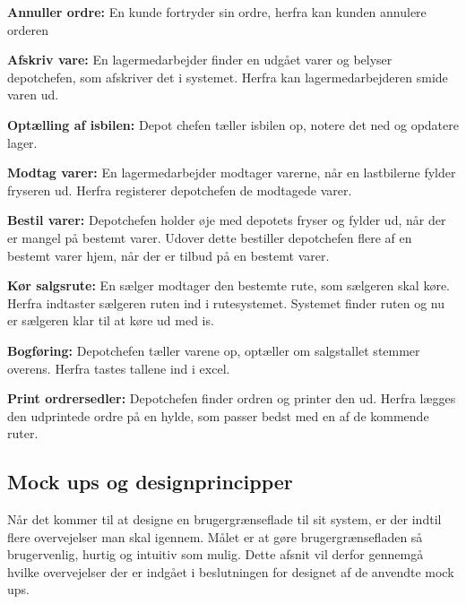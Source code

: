 \textbf{Annuller ordre:}
En kunde fortryder sin ordre, herfra kan kunden annulere orderen

\textbf{Afskriv vare:} 
En lagermedarbejder finder en udgået varer og belyser depotchefen, som afskriver det i systemet. Herfra kan lagermedarbejderen smide varen ud. 

\textbf{Optælling af isbilen:} 
Depot chefen tæller isbilen op, notere det ned og opdatere lager. 

\textbf{Modtag varer:} 
En lagermedarbejder modtager varerne, når en lastbilerne fylder fryseren ud. Herfra registerer depotchefen de modtagede varer. 

\textbf{Bestil varer:} 
Depotchefen holder øje med depotets fryser og fylder ud, når der er mangel på bestemt varer. Udover dette bestiller depotchefen flere af en bestemt varer hjem, når der er tilbud på en bestemt varer. 

\textbf{Kør salgsrute:} 
En sælger modtager den bestemte rute, som sælgeren skal køre. Herfra indtaster sælgeren ruten ind i rutesystemet. Systemet finder ruten og nu er sælgeren klar til at køre ud med is. 

\textbf{Bogføring:}
Depotchefen tæller varene op, optæller om salgstallet stemmer overens. Herfra tastes tallene ind i excel. 

\textbf{Print ordrersedler:}
Depotchefen finder ordren og printer den ud. Herfra lægges den udprintede ordre på en hylde, som passer bedst med en af de kommende ruter.

\subsection{Mock ups og designprincipper}
Når det kommer til at designe en brugergrænseflade til sit system, er der indtil flere overvejelser man skal igennem. Målet er at gøre brugergrænsefladen så brugervenlig, hurtig og intuitiv som mulig. Dette afsnit vil derfor gennemgå hvilke overvejelser der er indgået i beslutningen for designet af de anvendte mock ups.

